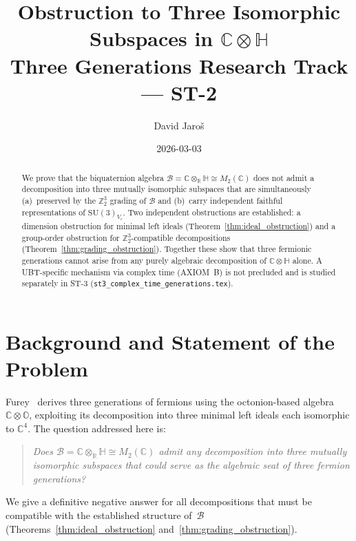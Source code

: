 \documentclass[12pt,a4paper]{article}
\title{%
  Obstruction to Three Isomorphic Subspaces in $\mathbb{C}\otimes\mathbb{H}$\\
  \large Three Generations Research Track --- ST-2
}
\author{David Jaro\v{s}}
\date{2026-03-03}
\theoremstyle{remark}
\begin{document}
\maketitle

\begin{abstract}
We prove that the biquaternion algebra $\mathcal{B} = \mathbb{C}\otimes_\mathbb{R}\mathbb{H}
\cong M_2(\mathbb{C})$ does not admit a decomposition into three mutually
isomorphic subspaces that are simultaneously (a)~preserved by the $\mathbb{Z}_2^3$
grading of $\mathcal{B}$ and (b)~carry independent faithful representations of
$\mathrm{SU}(3)_{V_c}$.  Two independent obstructions are established: a
dimension obstruction for minimal left ideals (Theorem~\ref{thm:ideal_obstruction})
and a group-order obstruction for $\mathbb{Z}_2^3$-compatible decompositions
(Theorem~\ref{thm:grading_obstruction}).  Together these show that three
fermionic generations cannot arise from any purely algebraic decomposition of
$\mathbb{C}\otimes\mathbb{H}$ alone.  A UBT-specific mechanism via complex time
(AXIOM~B) is not precluded and is studied separately in ST-3
(\texttt{st3\_complex\_time\_generations.tex}).
\end{abstract}

\tableofcontents

\section{Background and Statement of the Problem}
\label{sec:background}

Furey~\cite{Furey2016} derives three generations of fermions using the
octonion-based algebra $\mathbb{C}\otimes\mathbb{O}$, exploiting its
decomposition into three minimal left ideals each isomorphic to $\mathbb{C}^4$.
The question addressed here is:

\begin{quote}
\emph{Does $\mathcal{B} = \mathbb{C}\otimes_\mathbb{R}\mathbb{H} \cong
M_2(\mathbb{C})$ admit any decomposition into three mutually isomorphic
subspaces that could serve as the algebraic seat of three fermion generations?}
\end{quote}

We give a definitive negative answer for all decompositions that must be
compatible with the established structure of~$\mathcal{B}$
(Theorems~\ref{thm:ideal_obstruction} and~\ref{thm:grading_obstruction}).
\end{document}
